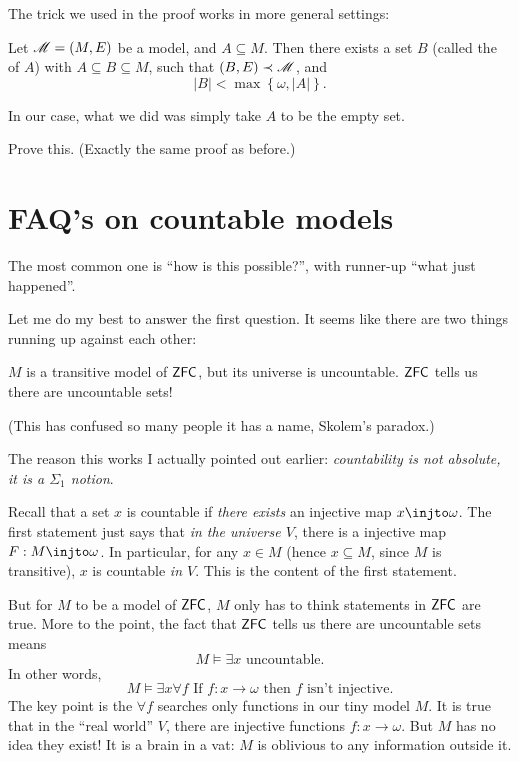 The trick we used in the proof works in more general settings:
\begin{theorem}
	Let $\mathscr M = (M,E)$ be a model, and $A \subseteq M$.
	Then there exists a set $B$ (called the  of $A$)
	with $A \subseteq B \subseteq M$,
	such that $(B,E) \prec \mathscr M$, and
	\[ \left\lvert B \right\rvert < \max \left\{ \omega, \left\lvert A \right\rvert \right\}. \]
\end{theorem}
In our case, what we did was simply take $A$ to be the empty set.
\begin{ques}
	Prove this. (Exactly the same proof as before.)
\end{ques}


\section{FAQ's on countable models}
The most common one is ``how is this possible?'',
with runner-up ``what just happened''.

Let me do my best to answer the first question.
It seems like there are two things running up against each other:
\begin{enumerate}[(1)]
	\ii $M$ is a transitive model of $\mathsf{ZFC}$, but its universe is uncountable.
	\ii $\mathsf{ZFC}$ tells us there are uncountable sets!
\end{enumerate}
(This has confused so many people it has a name, Skolem's paradox.)

The reason this works I actually pointed out earlier:
\emph{countability is not absolute, it is a $\Sigma_1$ notion}.

Recall that a set $x$ is countable if
\emph{there exists} an injective map $x \injto \omega$.
The first statement just says that \emph{in the universe $V$},
there is a injective map $F: M \injto \omega$.
In particular, for any $x \in M$ (hence $x \subseteq M$, since $M$ is transitive),
$x$ is countable \emph{in $V$}.
This is the content of the first statement.

But for $M$ to be a model of $\mathsf{ZFC}$, $M$ only has to think statements in $\mathsf{ZFC}$ are true.
More to the point, the fact that $\mathsf{ZFC}$ tells us there are uncountable sets means
\[ M \vDash \text{$\exists x$ uncountable}. \]
In other words,
\[ M \vDash \exists x \forall f
	\text{ If $f : x \to \omega$ then $f$ isn't injective}. \]
The key point is the $\forall f$ searches only functions in our tiny model $M$.
It is true that in the ``real world'' $V$, there are injective functions $f : x \to \omega$.
But $M$ has no idea they exist!
It is a brain in a vat: $M$ is oblivious to any information outside it.

